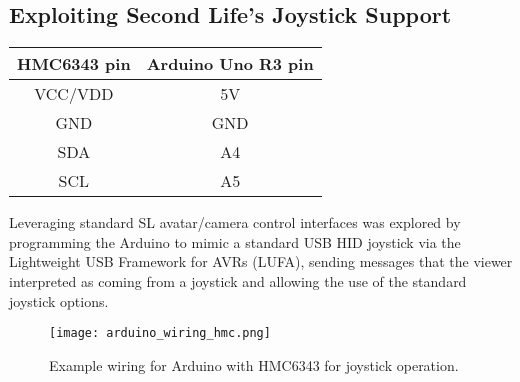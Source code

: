 

\subsection{Exploiting Second Life's Joystick Support}


\begin{center}
\begin{tabular}{| c | c |}

\hline	

\textbf{HMC6343 pin} & \textbf{Arduino Uno R3 pin} \\

\hline

VCC/VDD & 5V \\

\hline

GND & GND \\

\hline

SDA & A4 \\

\hline

SCL & A5 \\

\hline

\end{tabular}
\end{center}

Leveraging standard SL avatar/camera control interfaces was explored by programming the Arduino to mimic a standard USB HID joystick via the Lightweight USB Framework for AVRs (LUFA), sending messages that the viewer interpreted as coming from a joystick and allowing the use of the standard joystick options.

\begin{figure}[h]
\centering
  \texttt{[image: arduino\_wiring\_hmc.png]}
  \caption{Example wiring for Arduino with HMC6343 for joystick operation.}
  \label{arduino_wiring_hmc.png}
\end{figure}

